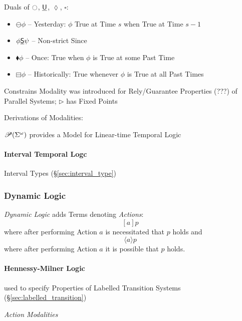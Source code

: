 Duals of $\ocircle$, $\underline{\mathsf{U}}$, $\lozenge$, $\square$:
\begin{itemize}
  \item $\ominus \phi$ -- Yesterday: $\phi$ True at Time $s$ when True
    at Time $s - 1$
  \item $\phi \underline{\mathsf{S}} \psi$ -- Non-strict Since
  \item $\blacklozenge \phi$ -- Once: True when $\phi$ is True at some
    Past Time
  \item $\boxminus \phi$ -- Historically: True whenever $\phi$ is True
    at all Past Times
\end{itemize}

Constrains Modality was introduced for Rely/Guarantee Properties (???)
of Parallel Systems; $\rhd$ has Fixed Points

Derivations of Modalities: %

$\mathscr{P}(\Sigma^\omega)$ provides a Model for Linear-time Temporal Logic
\cite{abramsky-gay-nagarajan96}



\paragraph{Interval Temporal Logc}\label{sec:interval_temporal}\hfill

Interval Types (\S\ref{sec:interval_type})



\subsubsection{Dynamic Logic}\label{sec:dynamic_logic}

\emph{Dynamic Logic} adds Terms denoting \emph{Actions}:
\[
  [a]p
\]
where after performing Action $a$ is necessitated that $p$ holds and
\[
  \langle a \rangle p
\]
where after performing Action $a$ it is possible that $p$ holds.



\paragraph{Hennessy-Milner Logic}\label{sec:hennessy_milner}
\hfill

used to specify Properties of Labelled Transition Systems
(\S\ref{sec:labelled_transition})

\emph{Action Modalities}



